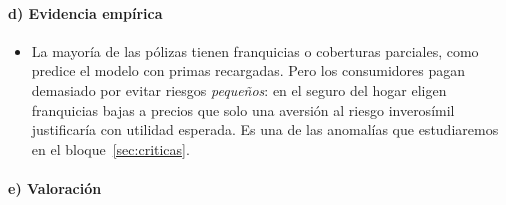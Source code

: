 \documentclass[11pt]{article}
\begin{document}
\paragraph{d) Evidencia empírica}

\begin{itemize}
\item La mayoría de las pólizas tienen franquicias o coberturas parciales, como predice el modelo con primas recargadas. Pero los consumidores pagan demasiado por evitar riesgos \emph{pequeños}: en el seguro del hogar eligen franquicias bajas a precios que solo una aversión al riesgo inverosímil justificaría con utilidad esperada\nocite{Sydnor2010Overinsuring}. Es una de las anomalías que estudiaremos en el bloque~\ref{sec:criticas}.
\end{itemize}

\paragraph{e) Valoración}
\end{document}
